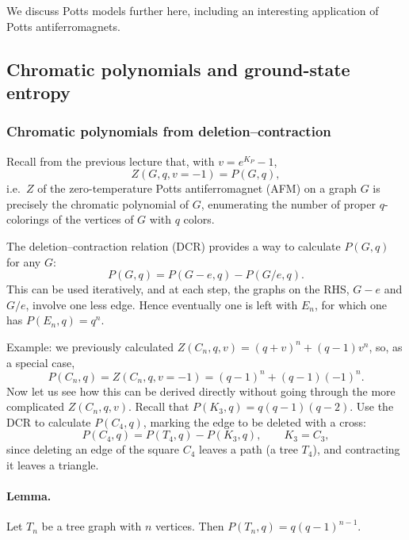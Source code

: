 
We discuss Potts models further here, including an interesting application of Potts
antiferromagnets.

\subsection{Chromatic polynomials and ground-state entropy}
\subsubsection*{Chromatic polynomials from deletion--contraction}

Recall from the previous lecture that, with $v = e^{K_P}-1$,
\begin{equation}
  Z(G,q,v=-1) = P(G,q),
\end{equation}
i.e.\ $Z$ of the zero-temperature Potts antiferromagnet (AFM) on a graph $G$ is precisely the
chromatic polynomial of $G$, enumerating the number of proper $q$-colorings of the vertices of
$G$ with $q$ colors.

The deletion--contraction relation (DCR) provides a way to calculate $P(G,q)$ for any $G$:
\begin{equation}
  P(G,q) = P(G-e,q) - P(G/e,q).
\end{equation}
This can be used iteratively, and at each step, the graphs on the RHS, $G-e$ and $G/e$, involve
one less edge. Hence eventually one is left with $E_n$, for which one has $P(E_n,q) = q^n$.

Example: we previously calculated $Z(C_n,q,v) = (q+v)^n + (q-1)v^n$, so, as a special case,
\begin{equation}
  P(C_n,q) = Z(C_n,q,v=-1) = (q-1)^n + (q-1)(-1)^n .
\end{equation}
Now let us see how this can be derived directly without going through the more complicated
$Z(C_n,q,v)$. Recall that $P(K_3,q) = q(q-1)(q-2)$. Use the DCR to calculate $P(C_4,q)$,
marking the edge to be deleted with a cross:
\begin{equation}
  P(C_4,q) = P(T_4,q) - P(K_3,q),\qquad K_3 = C_3 ,
\end{equation}
since deleting an edge of the square $C_4$ leaves a path (a tree $T_4$), and contracting it
leaves a triangle.

\paragraph{Lemma.} Let $T_n$ be a tree graph with $n$ vertices. Then
$P(T_n,q) = q(q-1)^{n-1}$.

